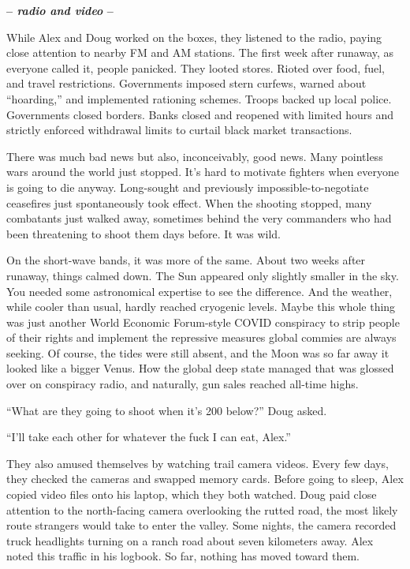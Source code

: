 \begin{center}\large\textbf{-- \emph{radio and video} --}\normalsize\end{center}

While Alex and Doug worked on the boxes, they listened to the radio,
paying close attention to nearby FM and AM stations. The first week
after runaway, as everyone called it, people panicked. They looted
stores. Rioted over food, fuel, and travel restrictions. Governments
imposed stern curfews, warned about ``hoarding,'' and implemented
rationing schemes. Troops backed up local police. Governments closed
borders. Banks closed and reopened with limited hours and strictly
enforced withdrawal limits to curtail black market transactions.

There was much bad news but also, inconceivably, good news. Many
pointless wars around the world just stopped. It's hard to motivate
fighters when everyone is going to die anyway. Long-sought and
previously impossible-to-negotiate ceasefires just spontaneously took
effect. When the shooting stopped, many combatants just walked away,
sometimes behind the very commanders who had been threatening to shoot
them days before. It was wild.

On the short-wave bands, it was more of the same. About two weeks after
runaway, things calmed down. The Sun appeared only slightly smaller in
the sky. You needed some astronomical expertise to see the difference.
And the weather, while cooler than usual, hardly reached cryogenic
levels. Maybe this whole thing was just another World Economic
Forum-style COVID conspiracy to strip people of their rights and
implement the repressive measures global commies are always seeking. Of
course, the tides were still absent, and the Moon was so far away it
looked like a bigger Venus. How the global deep state managed that was
glossed over on conspiracy radio, and naturally, gun sales reached
all-time highs.

``What are they going to shoot when it's 200 below?'' Doug asked.

``I'll take each other for whatever the fuck I can eat, Alex.''

They also amused themselves by watching trail camera videos. Every few
days, they checked the cameras and swapped memory cards. Before going to
sleep, Alex copied video files onto his laptop, which they both watched.
Doug paid close attention to the north-facing camera overlooking the
rutted road, the most likely route strangers would take to enter the
valley. Some nights, the camera recorded truck headlights turning on a
ranch road about seven kilometers away. Alex noted this traffic in his
logbook. So far, nothing has moved toward them.


